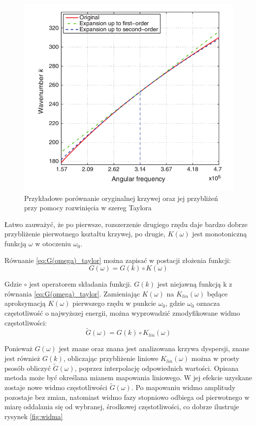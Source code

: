 \begin{figure}[h]
\centering
\includegraphics[width=14cm]{Zdjecia/4/buba}
\caption{Przykładowe porównanie oryginalnej krzywej oraz jej przybliżeń przy pomocy rozwinięcia w szereg Taylora \cite{kasia5}}
\label{fig:krzywa_taylorem}
\end{figure}

Łatwo zauważyć, że po pierwsze, rozszerzenie drugiego rzędu daje bardzo dobrze przybliżenie pierwotnego kształtu krzywej, po drugie, $K(\omega)$ jest monotoniczną funkcją $\omega$ w otoczeniu $\omega _0$. 

Równanie \ref{eq:G(omega)_taylor} można zapisać w postacji złożenia funkcji:
\begin{equation}
G(\omega) = G(k)\circ K(\omega)
\end{equation}

Gdzie $\circ$ jest operatorem składania funkcji. $G(k)$ jest niejawną funkcją k z równania \ref{eq:G(omega)_taylor}. Zamieniając $K(\omega)$ na $K_{lin}(\omega)$ będące aproksymacją $K(\omega)$ pierwszego rzędu w punkcie $\omega _0$, gdzie $\omega _0$ oznacza częstotliwość o najwyższej energii, można wyprowadzić zmodyfikowane widmo częstotliwości:
\begin{equation}
\widetilde{G}(\omega) = G(k)\circ K_{lin}(\omega)
\end{equation}

Ponieważ $G(\omega)$ jest znane oraz znana jest analizowana krzywa dyspersji, znane jest również $G(k)$, obliczając przybliżenie liniowe $K_{lin}(\omega)$ można w prosty psosób obliczyć $\widetilde{G}(\omega)$, poprzez interpolację odpowiednich wartości. Opisana metoda może być określana mianem mapowania liniowego. W jej efekcie uzyskane zostaje nowe widmo częstotliwości $\widetilde{G}(\omega)$. Po mapowaniu widmo amplitudy pozostaje bez zmian, natomiast widmo fazy stopniowo odbiega od pierwotnego w miarę oddalania się od wybranej, środkowej częstotliwości, co dobrze ilustruje rysynek \ref{fig:widma}

